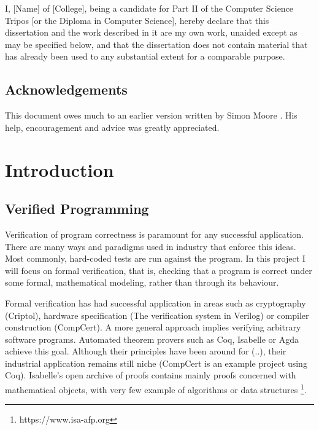 \documentclass[12pt,twoside,notitlepage]{report}
\begin{document}
I, [Name] of [College], being a candidate for Part II of the Computer
Science Tripos [or the Diploma in Computer Science], hereby declare
that this dissertation and the work described in it are my own work,
unaided except as may be specified below, and that the dissertation
does not contain material that has already been used to any substantial
extent for a comparable purpose.

\bigskip
{}

\medskip
{}

\cleardoublepage

\tableofcontents

\listoffigures

\newpage
\section*{Acknowledgements}

This document owes much to an earlier version written by Simon Moore
\cite{moore95}.  His help, encouragement and advice was greatly
appreciated.


\cleardoublepage        %

\setcounter{page}{1}
\pagestyle{headings}

\chapter{Introduction}

\section{Verified Programming}

Verification of program correctness is paramount for any successful application. There are many ways and paradigms used in industry that enforce this ideas. Most commonly, hard-coded tests are run against the program. In this project I will focus on formal verification, that is, checking that a program is correct under some formal, mathematical modeling, rather than through its behaviour.
	
Formal verification has had successful application in areas such as  cryptography (Criptol), hardware specification (The verification system in Verilog) or compiler construction (CompCert). 
A more general approach implies verifying arbitrary software programs. Automated theorem provers such as Coq, Isabelle or Agda achieve this goal. Although their principles have been around for (..), their industrial application remains still niche (CompCert is an example project using Coq). Isabelle’s open archive of proofs contains mainly proofs concerned with mathematical objects, with very few example of algorithms or data structures \footnote{https://www.isa-afp.org}. 
	
\end{document}
